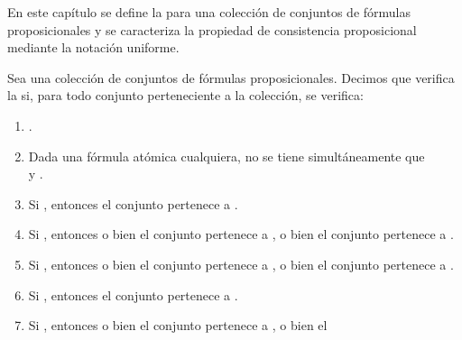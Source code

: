 %
\begin{isabellebody}%
%
%
\isadelimtheory
%
\endisadelimtheory
%
\isatagtheory
%
\endisatagtheory
{\isafoldtheory}%
%
\isadelimtheory
%
\endisadelimtheory
%
\begin{isamarkuptext}%
En este capítulo se define la  para una 
  colección de conjuntos de fórmulas proposicionales y se caracteriza la propiedad 
  de consistencia proposicional mediante la notación uniforme.

  \begin{definicion}
    Sea  una colección de conjuntos de fórmulas proposicionales. Decimos que
     verifica la  si, para todo
    conjunto  perteneciente a la colección, se verifica:
    \begin{enumerate}
      \item {}.
      \item Dada  una fórmula atómica cualquiera, no se tiene 
        simultáneamente que\\  y .
      \item Si , entonces el conjunto  pertenece a .
      \item Si , entonces o bien el conjunto  pertenece a , o bien el 
        conjunto  pertenece a .
      \item Si , entonces o bien el conjunto  pertenece a , o bien el 
        conjunto  pertenece a .
      \item Si , entonces el conjunto  pertenece a .
      \item Si , entonces o bien el conjunto  pertenece a , o bien el 

\end{enumerate}
\end{definicion}
\end{isamarkuptext}
\end{isabellebody}
